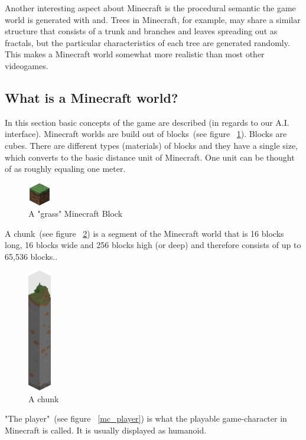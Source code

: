Another interesting aspect about Minecraft is the procedural semantic the game world is generated with and. Trees in Minecraft, for example, may share a similar structure that consists of a trunk and branches and leaves spreading out as fractals, but the particular characteristics of each tree are generated randomly. This makes a Minecraft world somewhat more realistic than most other videogames.

        \subsection{What is a Minecraft world?}
In this section basic concepts of the game are described (in regards to our A.I. interface). Minecraft worlds are build out of blocks~(see figure ~\ref{mc_block}). Blocks are cubes. There are different types (materials) of blocks and they have a single size, which converts to the basic distance unit of Minecraft. One unit can be thought of as roughly equaling one meter.

\begin{figure}[h]
  \centering
    \includegraphics[width=1cm]{graphics/block}
  \caption{A "grass" Minecraft Block}
  \label{mc_block}
\end{figure}
        
A chunk~(see figure ~\ref{mc_chunk}) is a segment of the Minecraft world that is 16 blocks long, 16 blocks wide and 256 blocks high (or deep) and therefore consists of up to 65,536 blocks..~\cite{mcwiki_chunks}

\begin{figure}[h]
  \centering
    \includegraphics[width=1cm]{graphics/chunk}
  \caption{A chunk}
  \label{mc_chunk}
\end{figure}

"The player"~(see figure ~\ref{mc_player}) is what the playable game-character in Minecraft is called. It is usually displayed as humanoid.


